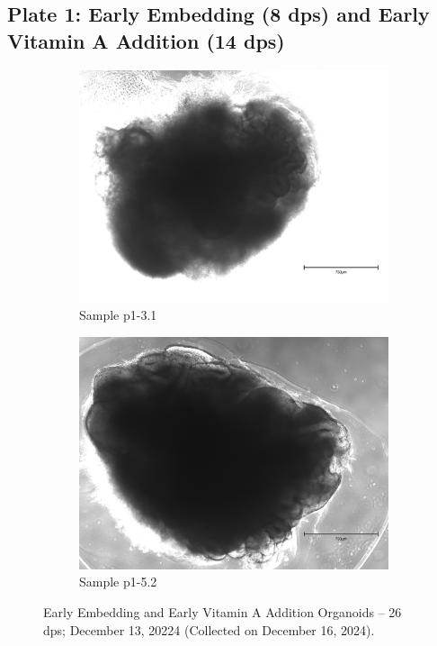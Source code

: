 \documentclass[11pt]{article}
\begin{document}
\subsection{Plate 1: Early Embedding (8 dps) and Early Vitamin A Addition (14 dps)}

\begin{figure}[H]
    \centering
    \begin{subfigure}[b]{0.40\textwidth}
        \centering
        \includegraphics[width=\textwidth]{p1-3.1.jpeg}
        \caption{Sample p1-3.1}
        \label{fig:p1-3.1}
    \end{subfigure}
    \hfill
    \begin{subfigure}[b]{0.40\textwidth}
        \centering
        \includegraphics[width=\textwidth]{p1-5.2.jpeg}
        \caption{Sample p1-5.2}
        \label{fig:p1-5.2}
    \end{subfigure}
    \caption{Early Embedding and Early Vitamin A Addition Organoids -- 26 dps; December 13, 20224 (Collected on December 16, 2024).}
    \label{fig:p1_gallery}
\end{figure}
\end{document}
